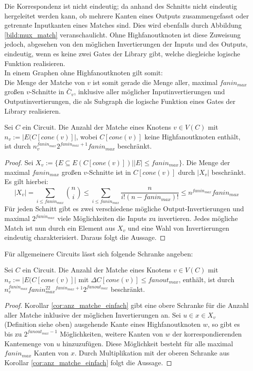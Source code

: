 \documentclass[11pt, a4paper, german]{article}
\begin{document}
Die Korrespondenz ist nicht eindeutig; da anhand des Schnitts nicht eindeutig hergeleitet werden kann, ob mehrere Kanten eines Outputs zusammengefasst oder getrennte Inputkanten eines Matches sind. Dies wird ebenfalls durch Abbildung \ref{bild:mux_match} veranschaulicht. Ohne Highfanoutknoten ist diese Zuweisung jedoch, abgesehen von den möglichen Invertierungen der Inputs und des Outputs, eindeutig, wenn es keine zwei Gates der Library gibt, welche diegleiche  logische Funktion realisieren.\\
In einem Graphen ohne Highfanoutknoten gilt somit: \\
Die Menge der Matche von $v$ ist somit gerade die Menge aller, maximal $fanin_{max}$ großen $v$-Schnitte in $\bar{C}_v$, inklusive aller möglicher Inputinvertierungen und Outputinvertierungen, die als Subgraph die logische Funktion eines Gates der Library realisieren.
\begin{cor}\label{cor:anz_matche_einfach}
Sei $C$ ein Circuit. Die Anzahl der Matche eines Knotens $v\in V(C)$ mit $n_v := |E(C[cone(v)]|$, wobei $C[cone(v)]$ keine Highfanoutknoten enthält, ist durch $n_v^{fanin_{max}} 2^{fanin_{max}+1} fanin_{max}$ beschränkt.
\end{cor}
\begin{proof}
Sei  $X_v:= \{ E \subseteq E(C[cone(v)]) | |E|\leq fanin_{max}  \}$. Die Menge der maximal $fanin_{max}$ großen $v$-Schnitte ist in $C[cone(v)]$ durch $ |X_v|$ beschränkt. Es gilt hierbei:
\[ |X_v| = \sum\limits_{i \leq fanin_{max}} \binom{n}{i} \leq  \sum\limits_{i \leq fanin_{max}}\frac{n}{i!(n-fanin_{max})!} \leq n^{fanin_{max}} fanin_{max} \]
Für jeden Schnitt gibt es zwei verschiedene mögliche Output-Invertierungen und maximal  $2^{fanin_{max}}$ viele Möglichkeiten die Inputs zu invertieren. Jedes mögliche Match ist nun durch ein Element aus $X_v$ und eine Wahl von Invertierungen eindeutig charakterisiert. Daraus folgt die Aussage.
\end{proof}
Für allgemeinere Circuits lässt sich folgende Schranke angeben: 
\begin{cor}\label{cor:anzahl_matche_bel}
Sei $C$ ein Circuit. Die Anzahl der Matche eines Knotens $v\in V(C)$ mit $n_v := |E(C[cone(v)]|$ mit $\Delta C[cone(v)] \leq fanout_{max}$, enthält, ist durch $n_v^{fanin_{max}} fanin_{max}^22^{fanin_{max}+1}2^{fanout_{max}}$ beschränkt.
\end{cor}
\begin{proof}
Korollar \ref{cor:anz_matche_einfach} gibt eine obere Schranke für die Anzahl aller Matche inklusive der möglichen Invertierungen an. Sei $u \in x \in X_v$ (Definition siehe oben) ausgehende Kante eines Highfanoutknoten $w$, so gibt es bis zu $2^{fanout_{max}-1}$ Möglichkeiten, weitere Kanten von $w$ der korrespondierenden Kantemenge von $u$ hinzuzufügen.  Diese Möglichkeit besteht für alle maximal $fanin_{max}$ Kanten von $x$. Durch Multiplikation mit der oberen Schranke aus Korollar \ref{cor:anz_matche_einfach} folgt die Aussage.
\end{proof}
\end{document}
